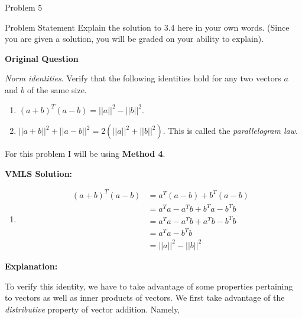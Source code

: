 \begin{problem}{Problem 5}
    \begin{statement}{Problem Statement}
        Explain the solution to 3.4 here in your own words. (Since you are given a solution, you will be graded on your ability to explain). \vspace*{1em}

        \textbf{Original Question} \vspace*{1em}

        \textit{Norm identities}. Verify that the following identities hold for any two vectors $a$ and $b$ of the same size.

        \begin{enumerate}[label=(\alph*)]
            \item $(a+b)^{T}(a-b) = ||a||^{2} - ||b||^{2}$.
            \item $||a+b||^{2} + ||a-b||^{2} = 2(||a||^{2}+||b||^{2})$. This is called the \textit{parallelogram law}.
        \end{enumerate}
    \end{statement}

    \begin{highlight}
        For this problem I will be using \textbf{Method 4}. \vspace*{1em}

        \textbf{VMLS Solution:}

        \begin{enumerate}[label=(\alph*)]
            \item 
            \begin{align*}
                (a+b)^{T}(a-b) & = a^{T}(a-b) + b^{T}(a-b) \\
                & = a^{T}a - a^{T}b + b^{T}a - b^{T}b \\
                & = a^{T}a - a^{T}b + a^{T}b - b^{T}b \\
                & = a^{T}a - b^{T}b \\
                & = ||a||^{2} - ||b||^{2}
            \end{align*}
        \end{enumerate}

        \textbf{Explanation:} \vspace*{1em}

        To verify this identity, we have to take advantage of some properties pertaining to vectors as well as inner products of vectors. We first take advantage of the \textit{distributive} property
        of vector addition. Namely,


\end{highlight}
\end{problem}

